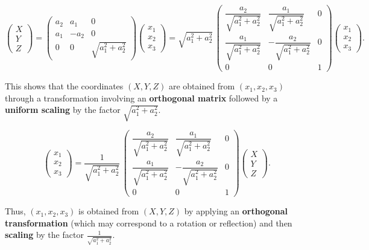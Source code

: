 \documentclass[12pt]{article}
\theoremstyle{plain}
\theoremstyle{definition}
\theoremstyle{remark}
\begin{document}
\[
\begin{pmatrix} 
	X\\
	Y \\
	Z
\end{pmatrix}
=
\begin{pmatrix} 
	a_2 & a_1 & 0 \\
	a_1 & -a_2 & 0 \\
	0 & 0 & \sqrt{a_1^2+a_2^2}
\end{pmatrix}
\begin{pmatrix} 
	x_1 \\
	x_2 \\
	x_3
\end{pmatrix}
= \sqrt{a_1^2+a_2^2}\,
\begin{pmatrix} 
	\dfrac{a_2}{\sqrt{a_1^2+a_2^2}} & \dfrac{a_1}{\sqrt{a_1^2+a_2^2}} & 0 \\
	\dfrac{a_1}{\sqrt{a_1^2+a_2^2}} & -\dfrac{a_2}{\sqrt{a_1^2+a_2^2}} & 0 \\
	0 & 0 & 1
\end{pmatrix}
\begin{pmatrix} 
	x_1 \\
	x_2 \\
	x_3
\end{pmatrix}.
\]

This shows that the coordinates \((X, Y, Z)\) are obtained from \((x_1, x_2, x_3)\) through a transformation involving an \textbf{orthogonal matrix} followed by a \textbf{uniform scaling} by the factor \(\sqrt{a_1^2 + a_2^2}\).

\[
\begin{pmatrix} 
	x_1 \\
	x_2 \\
	x_3
\end{pmatrix}
= \frac{1}{\sqrt{a_1^2+a_2^2}}\,
\begin{pmatrix} 
	\dfrac{a_2}{\sqrt{a_1^2+a_2^2}} & \dfrac{a_1}{\sqrt{a_1^2+a_2^2}} & 0 \\
	\dfrac{a_1}{\sqrt{a_1^2+a_2^2}} & -\dfrac{a_2}{\sqrt{a_1^2+a_2^2}} & 0 \\
	0 & 0 & 1
\end{pmatrix}
\begin{pmatrix} 
	X \\
	Y \\
	Z
\end{pmatrix}.
\]

Thus, \((x_1, x_2, x_3)\) is obtained from \((X, Y, Z)\) by applying an \textbf{orthogonal transformation} (which may correspond to a rotation or reflection) and then \textbf{scaling} by the factor \(\frac{1}{\sqrt{a_1^2 + a_2^2}}\).
\end{document}
